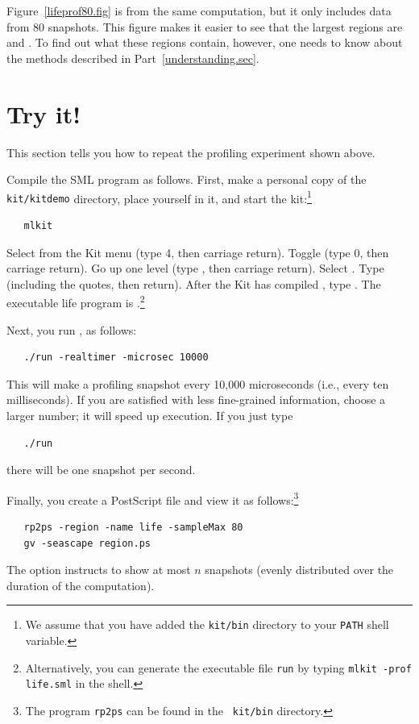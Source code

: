 \documentclass[12pt]{book}
\begin{document}
Figure~\ref{lifeprof80.fig} is from the same computation, but it only
includes data from 80 snapshots. This figure makes it easier to see
that the largest regions are  and . To
find out what these regions contain, however, one needs to know about
the methods described in Part~\ref{understanding.sec}.

\section{Try it!}
This section tells you how to repeat the profiling experiment shown
above.

Compile the SML program  as follows. First,
make a personal copy of the {\tt kit/kitdemo} directory, place
yourself in it, and start the kit:\footnote{We assume that you have added
  the {\tt kit/bin} directory to your {\tt PATH} shell variable.}
\begin{verbatim}
   mlkit
\end{verbatim}
Select  from the Kit menu (type 4, then carriage
return).  Toggle  (type 0, then carriage
return). Go up one level (type , then carriage return).
Select .  Type 
(including the quotes, then return). After the Kit has compiled
, type . The executable life program is
.\footnote{Alternatively, you can generate the
  executable file {\tt run} by typing {\tt mlkit -prof life.sml} in
  the shell.}

Next, you run , as follows:
\begin{verbatim}
   ./run -realtimer -microsec 10000
\end{verbatim}
This will make a profiling snapshot every 10,000 microseconds (i.e.,
every ten milliseconds). If you are satisfied with less fine-grained
information, choose a larger number; it will speed up execution. If
you just type
\begin{verbatim}
   ./run 
\end{verbatim}
there will be one snapshot per second.

Finally, you create a PostScript file and view it as
follows:\footnote{The program {\tt rp2ps} can be found in the {\tt
    kit/bin} directory.}
%
\begin{verbatim}
   rp2ps -region -name life -sampleMax 80 
   gv -seascape region.ps
\end{verbatim}
The option  instructs  to show at
most $n$ snapshots (evenly distributed over the duration of the
computation).
\end{document}
